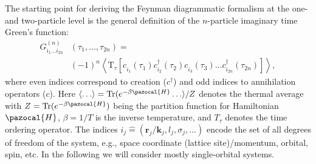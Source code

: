 \documentclass[rmp,aps,reprint,amsmath,amssymb,superscriptaddress,showpacs,nofootinbib]{revtex4-1}
\begin{document}
The starting point for deriving the Feynman diagrammatic formalism at the one- and two-particle level is the general definition of the $n$-particle imaginary time Green's function:
\begin{align}
 \label{equ:defngreengeneral}
 {G}^{(n)}_{i_1\ldots i_{2n}}&(\tau_1,\ldots,\tau_{2n})=\\&(-1)^n\left\langle \mbox{T}_\tau \left[c^{\phantom{\dagger}}_{i_1}(\tau_1)c^{\dagger}_{i_2}(\tau_2)c^{\phantom{\dagger}}_{i_3}(\tau_3) \dots c^{\dagger}_{i_{2n}}(\tau_{2n})\right]\right\rangle,\nonumber
\end{align}
where even indices correspond to creation ($c^{\dagger}$) and odd indices to annihilation operators ($c$). Here $\langle\ldots\rangle=\mbox{Tr}(e^{-\beta\pazocal{H}}\ldots\rangle/Z$ denotes the thermal average with $Z=\mbox{Tr}(e^{-\beta\pazocal{H}})$ being the partition function for Hamiltonian $\pazocal{H}$, $\beta=1/T$ is the inverse temperature, and $T_\tau$ denotes the time ordering operator. The indices $i_j\widehat{=}(\mathbf{r}_j/\mathbf{k}_j,l_j,\sigma_j,\ldots)$ encode the set of all degrees of freedom of the system, e.g., space coordinate (lattice site)/momentum, orbital, spin, etc. In the following we will consider mostly  single-orbital systems.
\end{document}
